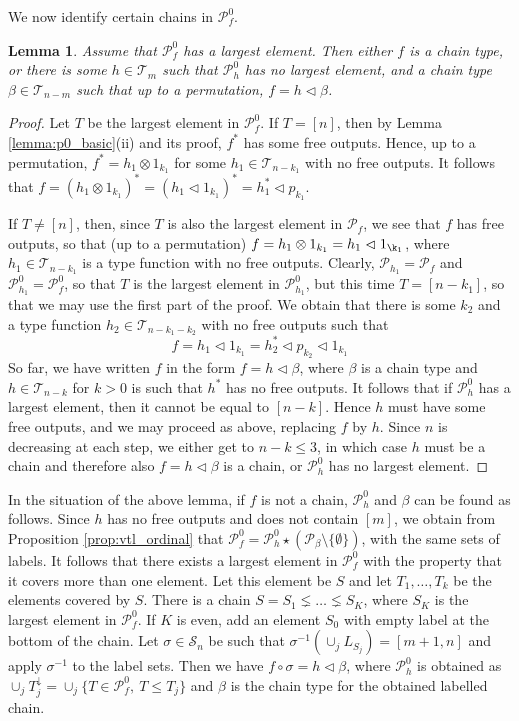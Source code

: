 \documentclass[12pt]{article}
\newtheorem{lemma}{Lemma}
\theoremstyle{definition}
\theoremstyle{remark}
\def\Te{\mathcal T}
\def\Pe{\mathcal P}
\def\permut{\mathscr{S}}
\def\vtl{\vartriangleleft}
\begin{document}
We now  identify certain chains in $\Pe_f^0$.

\begin{lemma}\label{lemma:pf0_largest} Assume that $\Pe_f^0$ has a largest element.  Then
either $f$ is a chain type, or there is some $h\in \Te_m$ such that $\Pe_h^0$ has  no largest element,
and a chain type $\beta\in \Te_{n-m}$ such that up to a permutation, $f=h\vtl \beta$.

\end{lemma}



\begin{proof} Let $T$ be the largest element in $\Pe_f^0$. If $T=[n]$, then by Lemma
\ref{lemma:p0_basic}(ii) and its proof, $f^*$ has some free outputs. Hence, up to a permutation,
$f^*=h_1\otimes 1_{k_1}$ for some $h_1\in \Te_{n-k_1}$ with no free outputs. It follows that
$f=(h_1\otimes 1_{k_1})^*=(h_1\vtl 1_{k_1})^*=h_1^*\vtl p_{k_1}$. 

If $T\ne [n]$, then, since $T$  
is also the largest element in $\Pe_f$, we see that $f$ has free outputs, so that (up to a
permutation)
$f=h_1\otimes 1_{k_1}=h_1\vtl 1_{\k_1}$, where $h_1\in \Te_{n-k_1}$ is a type function with no
free outputs. Clearly, $\Pe_{h_1}=\Pe_f$ and $\Pe_{h_1}^0=\Pe_f^0$, so that $T$ is the largest
element in $\Pe^0_{h_1}$, but this time $T=[n-k_1]$, so that we may use the first part of the
proof. We obtain that there is some $k_2$ and a type function  $h_2\in\Te_{n-k_1-k_2}$
with no free outputs such that 
\[
f=h_1\vtl 1_{k_1}=h_2^*\vtl p_{k_2}\vtl 1_{k_1}
\]
So far, we have written $f$ in the form $f=h\vtl \beta$, where $\beta$ is a chain type and
$h\in \Te_{n-k}$ for $k>0$ is such that $h^*$ has no free outputs. It follows that if
$\Pe_h^0$ has a largest element, then it cannot be equal to $[n-k]$. Hence $h$ must have
some free outputs, and we may proceed as above, replacing $f$ by $h$. Since $n$ is decreasing at each step, we
 either get to $n-k \le 3$, in which case $h$ must be a chain and therefore also $f=h\vtl
 \beta$ is a chain, or $\Pe^0_h$ has no largest element.


\end{proof}

In the situation of the above lemma, if $f$ is not a chain, $\Pe_h^0$ and  $\beta$ can be found as follows. 
Since $h$ has no free outputs and does not contain
$[m]$, we obtain from Proposition \ref{prop:vtl_ordinal} that $\Pe_f^0=\Pe_h^0\star
(\Pe_\beta\setminus\{\emptyset\})$, with the same sets of labels.
It follows that there exists a largest element in $\Pe_f^0$ with the property that
it covers more than one element. Let this element be $S$ and let $T_1,\dots, T_k$ be the
elements covered by $S$. There is a chain $S=S_1\lneq \dots \lneq S_K$, where $S_K$ is
the largest element in $\Pe_f^0$. If $K$ is even, add an element $S_0$ with empty
label at the bottom of the chain. Let $\sigma\in \permut_n$ be such that
$\sigma^{-1}(\cup_j L_{S_j})=[m+1,n]$ and apply $\sigma^{-1}$ to the label sets. 
Then we have $f\circ\sigma=h\vtl \beta$, where $\Pe_h^0$ is obtained as $\cup_j T_j^{\downarrow}=\cup_j\{T\in
\Pe_f^0,\ T\le T_j\}$ and $\beta$ is the chain type for the obtained labelled chain.
\end{document}
